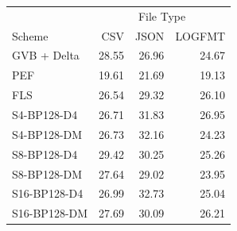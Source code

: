\begin{tabular}{lrrr}
\toprule
 & \multicolumn{3}{c}{File Type} \\
Scheme & CSV & JSON & LOGFMT \\
\midrule
GVB + Delta & 28.55 & 26.96 & 24.67 \\
PEF & 19.61 & 21.69 & 19.13 \\
FLS & 26.54 & 29.32 & 26.10 \\
S4-BP128-D4 & 26.71 & 31.83 & 26.95 \\
S4-BP128-DM & 26.73 & 32.16 & 24.23 \\
S8-BP128-D4 & 29.42 & 30.25 & 25.26 \\
S8-BP128-DM & 27.64 & 29.02 & 23.95 \\
S16-BP128-D4 & 26.99 & 32.73 & 25.04 \\
S16-BP128-DM & 27.69 & 30.09 & 26.21 \\
\bottomrule
\end{tabular}
